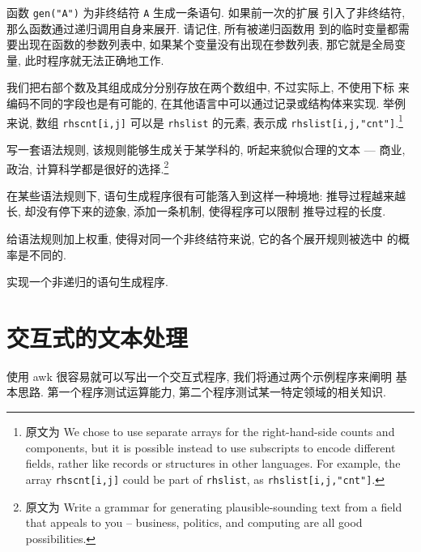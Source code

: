 函数 \texttt{gen("A")} 为非终结符 \texttt{A} 生成一条语句. 如果前一次的扩展
引入了非终结符, 那么函数通过递归调用自身来展开. 请记住, 所有被递归函数用%
%
到的临时变量都需要出现在函数的参数列表中, 如果某个变量没有出现在参数列表,
那它就是全局变量, 此时程序就无法正确地工作.

我们把右部个数及其组成成分分别存放在两个数组中, 不过实际上, 不使用下标
来编码不同的字段也是有可能的, 在其他语言中可以通过记录或结构体来实现. 
举例来说, 数组 \texttt{rhscnt[i,j]} 可以是 \texttt{rhslist} 的元素,
表示成 \texttt{rhslist[i,j,"cnt"]}.\footnote{原文为 We chose to use
    separate arrays for the right-hand-side counts and components, but it
    is possible instead to use subscripts to encode different fields,
    rather like records or structures in other languages. For example, the
    array \texttt{rhscnt[i,j]} could be part of \texttt{rhslist}, as
    \texttt{rhslist[i,j,"cnt"]}.}

\begin{exercise}
    写一套语法规则, 该规则能够生成关于某学科的, 听起来貌似合理的文本 ---
    商业, 政治, 计算科学都是很好的选择.\footnote{原文为 Write a grammar for
        generating plausible-sounding text from a field that appeals to you
    -- business, politics, and computing are all good possibilities.}
\end{exercise}

\begin{exercise}
    在某些语法规则下, 语句生成程序很有可能落入到这样一种境地:
    推导过程越来越长, 却没有停下来的迹象, 添加一条机制, 使得程序可以限制
    推导过程的长度.
\end{exercise}

\begin{exercise}
    给语法规则加上权重, 使得对同一个非终结符来说, 它的各个展开规则被选中
    的概率是不同的.
\end{exercise}

\begin{exercise}
    实现一个非递归的语句生成程序.
\end{exercise}

\section{交互式的文本处理}
\label{sec:interactive_text_manipulation}

使用 awk 很容易就可以写出一个交互式程序, 我们将通过两个示例程序来阐明
基本思路. 第一个程序测试运算能力, 第二个程序测试某一特定领域的相关知识.

